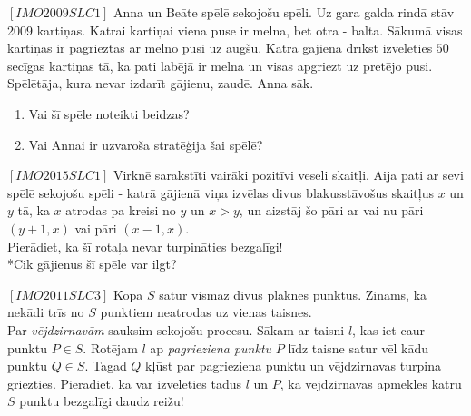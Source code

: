 



\renewcommand{\theenumi}{\alph{enumi}}



\noindent 

\begin{problem}
$[IMO2009SLC1]$
Anna un Beāte spēlē sekojošu spēli. Uz gara galda rindā stāv 2009 kartiņas. Katrai kartiņai viena puse ir melna, bet otra - balta. Sākumā visas kartiņas ir pagrieztas ar melno pusi uz augšu. Katrā gajienā drīkst izvēlēties $50$ secīgas kartiņas tā, ka pati labējā ir melna un visas apgriezt uz pretējo pusi. Spēlētāja, kura nevar izdarīt gājienu, zaudē. Anna sāk. 

\begin{enumerate}
\item Vai šī spēle noteikti beidzas?
\item Vai Annai ir uzvaroša stratēģija šai spēlē?
\end{enumerate}

\end{problem}


\begin{problem}
$[IMO2015SLC1]$
Virknē sarakstīti vairāki pozitīvi veseli skaitļi. Aija pati ar sevi spēlē sekojošu spēli - katrā gājienā viņa izvēlas divus blakusstāvošus skaitļus $x$ un $y$ tā, ka $x$ atrodas pa kreisi no $y$ un $x>y$, un aizstāj šo pāri ar vai nu pāri $(y+1,x)$ vai pāri $(x-1,x)$. \\
Pierādiet, ka šī rotaļa nevar turpināties bezgalīgi!\\
*Cik gājienus šī spēle var ilgt?
\end{problem}


\begin{problem}
$[IMO2011SLC3]$
Kopa  $S$ satur vismaz divus plaknes punktus. Zināms, ka nekādi trīs no $S$ punktiem neatrodas uz vienas taisnes.\\
Par \textit{vējdzirnavām} sauksim sekojošu procesu. Sākam ar taisni $l$, kas iet caur punktu $P\in S$. Rotējam $l$ ap \textit{pagrieziena punktu} $P$ līdz taisne satur vēl kādu punktu $Q \in S$. Tagad $Q$ kļūst par pagrieziena punktu un vējdzirnavas turpina griezties.
Pierādiet, ka var izvelēties tādus $l$ un $P$, ka vējdzirnavas apmeklēs katru $S$ punktu bezgalīgi daudz reižu!
\end{problem}

